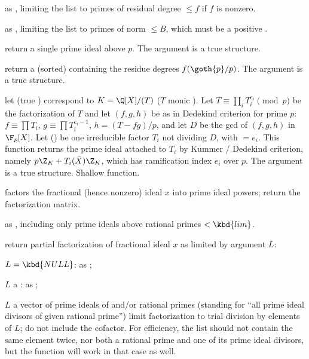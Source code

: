  as ,
limiting the list to primes of residual degree $\leq f$ if $f$ is nonzero.

 as
, limiting the list to primes of norm $\leq B$, which
must be a positive .

 return a single prime ideal
above $p$.
The  argument is a true  structure.

 return a (sorted)
 containing the residue degrees $f(\goth{p} / p)$.
The  argument is a true  structure.

 let 
(true ) correspond to $K = \Q[X]/(T)$ ($T$ monic ).
Let $T \equiv \prod_i T_i^{e_i} \pmod{p}$ be the factorization of $T$ and let
$(f,g,h)$ be as in Dedekind criterion for prime $p$: $f \equiv \prod T_i$,
$g \equiv \prod T_i^{e_i-1}$, $h = (T - fg) / p$, and let $D$ be the gcd
of $(f,g,h)$ in $\F_p[X]$. Let  () be one irreducible factor
$T_i$ not dividing $D$, with  $= e_i$. This function returns the
prime ideal attached to $T_i$ by Kummer / Dedekind criterion, namely
$p \Z_K + T_i(\bar{X}) \Z_K$, which has ramification index $e_i$ over $p$.
The  argument is a true  structure.
Shallow function.

 factors the fractional (hence nonzero)
ideal $x$ into prime ideal powers; return the factorization matrix.

 as ,
including only prime ideals above rational primes $< \kbd{lim}$.

 return partial
factorization of fractional ideal $x$ as limited by argument $L$:

\item $L = \kbd{NULL}$: as ;

\item $L$ a : as ;

\item $L$ a vector of prime ideals of  and/or rational primes
(standing for ``all prime ideal divisors of given rational prime'') limit
factorization to trial division by elements of $L$; do not include the
cofactor. For efficiency, the list should not contain the same element twice,
nor both a rational prime and one of its prime ideal divisors, but the
function will work in that case as well.

